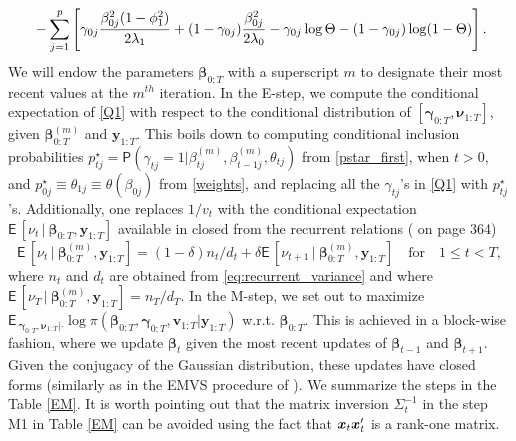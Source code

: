 \documentclass[ba]{imsart}
\numberwithin{equation}{section}
\theoremstyle{plain}
\def\B{\mbox{\boldmath$B$}}
\def\bG{\bm{\Gamma}}
\def\x{\mbox{\boldmath$x$}}
\def\y{\mbox{\boldmath$y$}}
\def\b{\mbox{\boldmath$b$}}
\def\B{\mbox{\boldmath$B$}}
\newcommand{\bm}[1]{\boldsymbol{#1}}
\newcommand{\E}{\mathsf{E\,}}
\renewcommand{\P}{\mathsf{P}}
\newcommand{\Y}{\bm{Y}}
\def\C {\,|\:}
\def\C {\,|\:}
\def\B{\bm{B}}
\def\Y{\bm{Y}}
\def\y{\bm{y}}
\def\bg{\bm{\gamma}}
\def\b{\bm{\beta}}
\begin{document}
{{{\begin{align}
&\quad-\sum_{j=1}^p\left[\gamma_{0j}\frac{\beta_{0j}^2(1-\phi_1^2)}{2\lambda_1}+(1-\gamma_{0j})\frac{\beta_{0j}^2}{2\lambda_0}-\gamma_{0j}\log\Theta-(1-\gamma_{0j})\log(1-\Theta)\right]\notag.
\end{align}
We will  endow  the parameters  $\b_{0:T}$ with a superscript $m$ to designate their most recent values at the $m^{th}$ iteration. In the E-step, we compute the conditional expectation 
of \eqref{Q1} with respect to the conditional distribution of $[\bg_{0:T},\bm \nu_{1:T}]$, given $\b_{0:T}^{(m)}$ and $\bm y_{1:T}$. This boils down to computing conditional inclusion probabilities
 $
 p^\star_{tj}=\P(\gamma_{tj}=1|\beta_{tj}^{(m)},\beta_{t-1j}^{(m)},\theta_{tj})
 $ 
 from \eqref{pstar_first}, when $t>0$, and $p^\star_{0j}\equiv\theta_{1j}\equiv\theta(\beta_{0j})$ from \eqref{weights},  and replacing all the $\gamma_{tj}$'s in \eqref{Q1} with $p^\star_{tj}$'s. 
 Additionally, one replaces $1/v_t$ with the conditional expectation $\E[\nu_t\C \b_{0:T}, \bm y_{1:T}]$ available in closed from the recurrent relations (\cite{WestHarrison1997book2} on page 364)
 $$
 \E[\nu_t\C\b_{0:T}^{(m)}, \bm y_{1:T}]=(1-\delta)n_{t}/d_t+\delta \E[\nu_{t+1}\C \b_{0:T}^{(m)}, \bm y_{1:T}]\quad\text{for}\quad 1\leq t<T,
 $$
 where $n_t$ and $d_t$ are obtained from \eqref{eq:recurrent_variance} and where $ \E[\nu_T\C \b_{0:T}^{(m)}, \bm y_{1:T}]=n_T/d_T$.
In the M-step, we set out to maximize $\E_{\bg_{0:T},\bm \nu_{1:T}|\cdot}\log\pi(\b_{0:T},\bg_{0:T},\bm v_{1:T}|\y_{1:T})$ w.r.t. $\b_{0:T}$.  This is achieved in a block-wise fashion, where we update $\b_t$ given the most recent updates of $\b_{t-1}$ and $\b_{t+1}$. Given the conjugacy of the Gaussian distribution, these updates have closed forms (similarly as in the EMVS procedure of \cite{RG14}). We summarize the steps in the Table \ref{EM}. 
It is worth pointing out that the matrix inversion $\Sigma_t^{-1}$ in the step M1 in Table \ref{EM} can be avoided  using the fact that $\x_t\x_t'$ is a rank-one matrix. 
}}}
\end{document}
